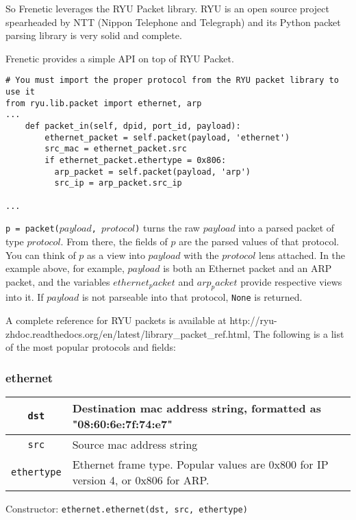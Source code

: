 So Frenetic leverages the RYU Packet library.
RYU is an open source project spearheaded by NTT (Nippon Telephone and Telegraph) and its Python packet
parsing library is very solid and complete.

Frenetic provides a simple API on top of RYU Packet.

\begin{lstlisting}
# You must import the proper protocol from the RYU packet library to use it
from ryu.lib.packet import ethernet, arp
...
    def packet_in(self, dpid, port_id, payload):
        ethernet_packet = self.packet(payload, 'ethernet')
        src_mac = ethernet_packet.src
        if ethernet_packet.ethertype = 0x806:
          arp_packet = self.packet(payload, 'arp')
          src_ip = arp_packet.src_ip

...
\end{lstlisting}

\texttt{p = packet($payload$, $protocol$)} turns the raw $payload$ into a parsed packet of type $protocol$.  
From there, the fields of $p$ are the parsed values of that protocol.  
You can think of $p$ as a view into $payload$ with the $protocol$ lens attached.  
In the example above, for example, $payload$ is both an Ethernet packet and an ARP packet, and the 
variables $ethernet_packet$ and $arp_packet$ provide respective views into it.   
If $payload$ is not parseable into that protocol, \texttt{None} is returned.  

A complete reference for RYU packets is available at 
http://ryu-zhdoc.readthedocs.org/en/latest/library\_packet\_ref.html, 
The following is a list of the most popular protocols and fields:

\subsubsection{ethernet}

\bigskip
\begin{tabularx}{6in}{|c|X|}
\hline\hline
\texttt{dst} & Destination mac address string, formatted as "08:60:6e:7f:74:e7" 
\\ \hline
\texttt{src} & Source mac address string 
\\ \hline
\texttt{ethertype} & Ethernet frame type.  
Popular values are 0x800 for IP version 4, or 0x806 for ARP.  
\\ \hline\hline
\end{tabularx}

\bigskip
Constructor: \texttt{ethernet.ethernet(dst, src, ethertype)}

